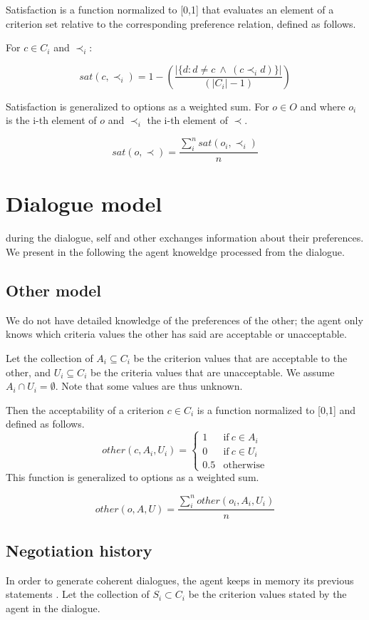 \documentclass{article}
\begin{document}
	Satisfaction is a function normalized to [0,1] that evaluates an element of a criterion set relative to the corresponding preference relation, defined as follows.
	
	For $c \in C_i$ and $\prec_i$:
	
	$$sat(c, \prec_i) =	1 - \left( \frac{|\{d : d \neq c \  \wedge \ (c \prec_i d)\}| }{( |C_i| - 1 )}\right)  $$
	
	Satisfaction is generalized to options as a weighted sum.
	For $o \in O$ and where $o_i$ is the i-th element of $o$ and $\prec_i$ the i-th element of $\prec$.
	
	$$sat(o, \prec) = \frac{\sum_{i}^{n} sat(o_i, \prec_i) }{n} $$
	
	
	\section{Dialogue model}
	during the dialogue, self and other exchanges information about their preferences. We present in the following the agent knoweldge processed from the dialogue.
	\subsection{Other model}
		We do not have detailed knowledge of the preferences of the other; the agent only knows which criteria values the other has said are acceptable or unacceptable.

		Let the collection of $A_i \subseteq C_i$ be the criterion values that are acceptable to the other, and $U_i \subseteq C_i$ be the criteria values that are unacceptable.  We assume $A_i \cap U_i = \emptyset$.  Note	that some values are thus unknown.

		Then the acceptability of a criterion $c \in C_i$ is a function normalized to [0,1] and defined as follows.
		$$ other(c, A_i, U_i)= \left\{\begin{array}{ll}
			1	 & \mathrm{if\ }  c \in A_i\\
			0    & \mathrm{if\ }c \in U_i\\
			0.5	 & \mathrm{otherwise}
			\end{array}\right.$$
		This function is generalized to options as a weighted sum.
	
		$$other(o, A, U) = \frac{ \sum_{i}^{n} other(o_i, A_i, U_i) } {n}$$ 
	
	\subsection{Negotiation history}
		In order to generate coherent dialogues, the agent keeps in memory its previous statements .
		Let the collection of $S_i \subset C_i$ be the criterion values stated by the agent in the dialogue.
		
\end{document}

